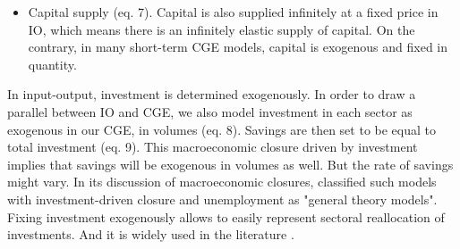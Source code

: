 \begin{itemize}
	\item Capital supply (eq. 7). Capital is also supplied infinitely at a fixed price in IO, which means there is an infinitely elastic supply of capital. On the contrary, in many short-term CGE models, capital is exogenous and fixed in quantity.
\end{itemize}

In input-output, investment is determined exogenously. In order to draw a parallel between IO and CGE, we also model investment in each sector as exogenous in our CGE, in volumes (eq. 8). Savings are then set to be equal to total investment (eq. 9). 
This macroeconomic closure driven by investment implies that savings will be exogenous in volumes as well. But the rate of savings might vary. 
In its discussion of macroeconomic closures, \citet[p. 57]{Sen1963} classified such models with investment-driven closure and unemployment as "general theory models".
Fixing investment exogenously allows to easily represent sectoral reallocation of investments. And it is widely used in the literature \citep{Lehr2008,Lehr2012}.


